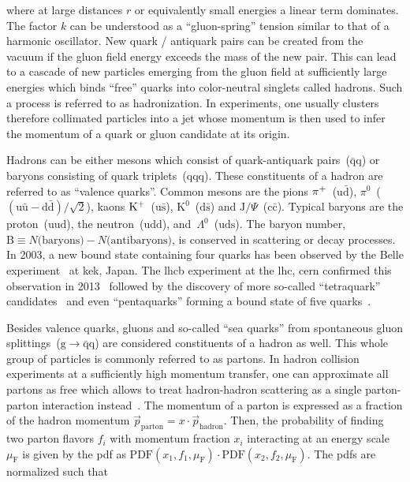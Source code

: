 where at large distances $r$ or equivalently small energies a linear term dominates. The factor $k$ can be understood as a ``gluon-spring'' tension similar to that of a harmonic oscillator. New quark / antiquark pairs can be created from the vacuum if the gluon field energy exceeds the mass of the new pair. This can lead to a cascade of new particles emerging from the gluon field at sufficiently large energies which binds ``free'' quarks into color-neutral singlets called hadrons. Such a process is referred to as hadronization. In experiments, one usually clusters therefore collimated particles into a jet whose momentum is then used to infer the momentum of a quark or gluon candidate at its origin.

Hadrons can be either mesons which consist of quark-antiquark pairs~($\bar{\mathrm{q}}\mathrm{q}$) or baryons consisting of quark triplets~($\mathrm{qqq}$). These constituents of a hadron are referred to as ``valence quarks''. Common mesons are the pions $\pi^{+}$~($\mathrm{u}\bar{\mathrm{d}}$), $\pi^{0}$~($(\mathrm{u}\bar{\mathrm{u}}-\mathrm{d}\bar{\mathrm{d}})/\sqrt{2}$), kaons $\mathrm{K}^{+}$~($\mathrm{u}\bar{\mathrm{s}}$), $\mathrm{K}^{0}$~($\mathrm{d}\bar{\mathrm{s}}$) and $\mathrm{J}/\Psi$~($\mathrm{c}\bar{\mathrm{c}}$). Typical baryons are the proton~($\mathrm{uud}$), the neutron~($\mathrm{udd}$), and~$\Lambda^{0}$~($\mathrm{uds}$). The baryon number, $\mathrm{B}\equiv N\text{(baryons)}-N\text{(antibaryons)}$, is conserved in scattering or decay processes. In 2003, a new bound state containing four quarks has been observed by the Belle experiment~\cite{PhysRevLett.91.262001} at \gls{kek}, Japan. The \gls{lhcb} experiment at the \gls{lhc}, \gls{cern} confirmed this observation in 2013~\cite{Aaij:2013zoa} followed by the discovery of more so-called ``tetraquark'' candidates~\cite{Aaij:2014jqa,Aaij:2016iza} and even ``pentaquarks'' forming a bound state of five quarks~\cite{Aaij:2015tga}.

Besides valence quarks, gluons and so-called ``sea quarks'' from spontaneous gluon splittings~($\mathrm{g}\to\bar{\mathrm{q}}\mathrm{q}$) are considered constituents of a hadron as well. This whole group of particles is commonly referred to as partons. In hadron collision experiments at a sufficiently high momentum transfer, one can approximate all partons as free which allows to treat hadron-hadron scattering as a single parton-parton interaction instead~\cite{Feynman:1969wa}. The momentum of a parton is expressed as a fraction of the hadron momentum $\vec{p}_\mathrm{parton}=x\cdot \vec{p}_\mathrm{hadron}$. Then, the probability of 
finding two parton flavors $f_{i}$ with momentum fraction $x_{i}$ interacting at an energy scale $\mu_\mathrm{F}$ is given by the \gls{pdf} as $\mathrm{PDF}(x_{1},f_{1},\mu_\mathrm{F})\cdot\mathrm{PDF}(x_{2},f_{2},\mu_\mathrm{F})$. The \glspl{pdf} are normalized such that

